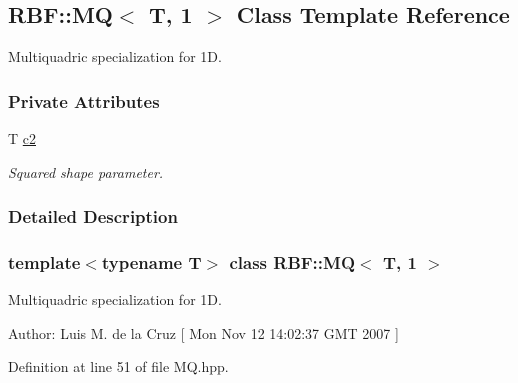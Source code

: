 \hypertarget{classRBF_1_1MQ_3_01T_00_011_01_4}{
\subsection{RBF::MQ$<$ T, 1 $>$ Class Template Reference}
\label{classRBF_1_1MQ_3_01T_00_011_01_4}
}
Multiquadric specialization for 1D.  


\subsubsection*{Private Attributes}
\begin{CompactItemize}
\item 
\hypertarget{classRBF_1_1MQ_3_01T_00_011_01_4_9b833bfe5fdc36b36d0521148b52185a}{
T \hyperlink{classRBF_1_1MQ_3_01T_00_011_01_4_9b833bfe5fdc36b36d0521148b52185a}{c2}}
\label{classRBF_1_1MQ_3_01T_00_011_01_4_9b833bfe5fdc36b36d0521148b52185a}

\begin{CompactList}\small\item\em Squared shape parameter. \item\end{CompactList}\end{CompactItemize}


\subsubsection{Detailed Description}
\subsubsection*{template$<$typename T$>$ class RBF::MQ$<$ T, 1 $>$}

Multiquadric specialization for 1D. 

\begin{Desc}
\item[Author:]Luis M. de la Cruz \mbox{[} Mon Nov 12 14:02:37 GMT 2007 \mbox{]} \end{Desc}


Definition at line 51 of file MQ.hpp.